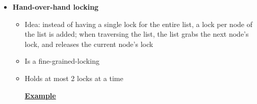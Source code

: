 \documentclass[12pt]{article}
\begin{document}
\begin{enumerate}[1.]
\begin{enumerate}[a)]
\begin{itemize}
\begin{itemize}
            \end{itemize}
            \item \textbf{Hand-over-hand locking}

            \begin{itemize}
                \item Idea: instead of having a single lock for the entire list, a lock per node
                of the list is added; when traversing the list, the list grabs the next node's lock,
                and releases the current node's lock
                \item Is a fine-grained-locking
                \item Holds at most 2 locks at a time

                \bigskip

                \underline{\textbf{Example}}

                \bigskip


\end{itemize}
\end{itemize}
\end{enumerate}
\end{enumerate}
\end{document}
